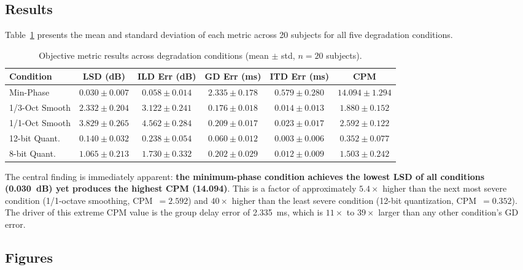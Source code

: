 \documentclass[12pt,a4paper]{article}
\begin{document}
\subsection{Results}

Table~\ref{tab:results} presents the mean and standard deviation of each metric across 20 subjects for all five degradation conditions.

\begin{table}[h!]
\centering
\caption{Objective metric results across degradation conditions (mean $\pm$ std, $n = 20$ subjects).}
\label{tab:results}
\begin{tabular}{lccccc}
\toprule
\textbf{Condition} & \textbf{LSD (dB)} & \textbf{ILD Err (dB)} & \textbf{GD Err (ms)} & \textbf{ITD Err (ms)} & \textbf{CPM} \\
\midrule
Min-Phase        & $0.030 \pm 0.007$ & $0.058 \pm 0.014$ & $2.335 \pm 0.178$ & $0.579 \pm 0.280$ & $\mathbf{14.094 \pm 1.294}$ \\
1/3-Oct Smooth   & $2.332 \pm 0.204$ & $3.122 \pm 0.241$ & $0.176 \pm 0.018$ & $0.014 \pm 0.013$ & $1.880 \pm 0.152$ \\
1/1-Oct Smooth   & $3.829 \pm 0.265$ & $4.562 \pm 0.284$ & $0.209 \pm 0.017$ & $0.023 \pm 0.017$ & $2.592 \pm 0.122$ \\
12-bit Quant.    & $0.140 \pm 0.032$ & $0.238 \pm 0.054$ & $0.060 \pm 0.012$ & $0.003 \pm 0.006$ & $0.352 \pm 0.077$ \\
8-bit Quant.     & $1.065 \pm 0.213$ & $1.730 \pm 0.332$ & $0.202 \pm 0.029$ & $0.012 \pm 0.009$ & $1.503 \pm 0.242$ \\
\bottomrule
\end{tabular}
\end{table}

The central finding is immediately apparent: \textbf{the minimum-phase condition achieves the lowest LSD of all conditions (0.030~dB) yet produces the highest CPM (14.094)}. This is a factor of approximately $5.4\times$ higher than the next most severe condition (1/1-octave smoothing, CPM~$= 2.592$) and $40\times$ higher than the least severe condition (12-bit quantization, CPM~$= 0.352$). The driver of this extreme CPM value is the group delay error of 2.335~ms, which is $11\times$ to $39\times$ larger than any other condition's GD error.

\subsection{Figures}
\end{document}
